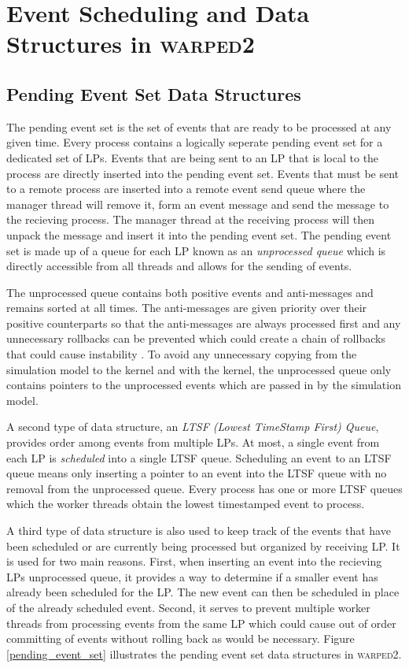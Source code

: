 \documentclass[11pt]{book}
\begin{document}
\chapter[Event Scheduling]{Event Scheduling and Data Structures in \textsc{warped2}}\label{warped2_ds}

\section{Pending Event Set Data Structures}

The pending event set is the set of events that are ready to be processed at any given time.
Every process contains a logically seperate pending event set for a dedicated set of LPs. Events
that are being sent to an LP that is local to the process are directly inserted into the pending
event set. Events that must be sent to a remote process are inserted into a remote event send
queue where the manager thread will remove it, form an event message and send the message to
the recieving process. The manager thread at the receiving process will then unpack the message
and insert it into the pending event set. The pending event set is made up of a queue for each
LP known as an \emph{unprocessed queue} which is directly accessible from all threads and allows
for the sending of events.

The unprocessed queue contains both positive events and anti-messages and remains sorted at all
times. The anti-messages are given priority over their positive counterparts so that the
anti-messages are always processed first and any unnecessary rollbacks can be prevented which
could create a chain of rollbacks that could cause instability \cite{lubachevsky-89}. To avoid
any unnecessary copying from the simulation model to the kernel and with the kernel, the
unprocessed queue only contains pointers to the unprocessed events which are passed in by the
simulation model.

A second type of data structure, an \emph{LTSF (Lowest TimeStamp First) Queue}, provides
order among events from multiple LPs. At most, a single event from each LP is \emph{scheduled}
into a single LTSF queue. Scheduling an event to an LTSF queue means only inserting a pointer
to an event into the LTSF queue with no removal from the unprocessed queue. Every process has
one or more LTSF queues which the worker threads obtain the lowest timestamped event to process.

A third type of data structure is also used to keep track of the events that have been
scheduled or are currently being processed but organized by receiving LP. It is used for
two main reasons. First, when inserting an event into the recieving LPs unprocessed queue, it
provides a way to determine if a smaller event has already been scheduled for the LP. The new
event can then be scheduled in place of the already scheduled event. Second, it serves to
prevent multiple worker threads from processing events from the same LP which could cause
out of order committing of events without rolling back as would be necessary.
Figure \ref{pending_event_set} illustrates the pending event set data structures in
\textsc{warped2}.
\end{document}
